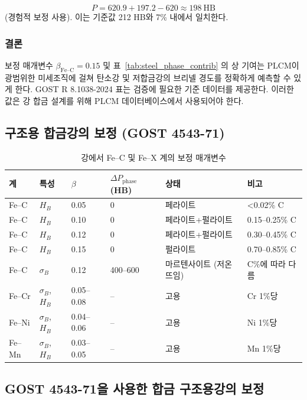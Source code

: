 \documentclass[12pt,a4paper]{article}
\begin{document}
	\[
	P = 620.9 + 197.2 - 620 \approx 198\ \text{HB}
	\]
	(경험적 보정 사용). 이는 기준값 212 HB와 7\% 내에서 일치한다.
	
	\subsubsection{결론}
	
	보정 매개변수 $\beta_{\text{Fe–C}} = 0.15$ 및 표~\ref{tab:steel_phase_contrib} 의 상 기여는 PLCM이 광범위한 미세조직에 걸쳐 탄소강 및 저합금강의 브리넬 경도를 정확하게 예측할 수 있게 한다. GOST R 8.1038-2024 표는 검증에 필요한 기준 데이터를 제공한다. 이러한 값은 강 합금 설계를 위해 PLCM 데이터베이스에서 사용되어야 한다.
	
	\subsection{구조용 합금강의 보정 (GOST 4543-71)}
	\begin{longtable}{p{2.5cm} p{1.2cm} p{1.2cm} p{1.5cm} p{2.0cm} p{2.0cm}}
		\caption{강에서 Fe–C 및 Fe–X 계의 보정 매개변수}\\
		\toprule
		\textbf{계} & \textbf{특성} & $\beta$ & $\Delta P_{\text{phase}}$ (HB) & \textbf{상태} & \textbf{비고} \\
		\midrule
		Fe–C & $H_B$ & 0.05 & 0 & 페라이트 & <0.02\% C \\
		Fe–C & $H_B$ & 0.10 & 0 & 페라이트+펄라이트 & 0.15–0.25\% C \\
		Fe–C & $H_B$ & 0.12 & 0 & 페라이트+펄라이트 & 0.30–0.45\% C \\
		Fe–C & $H_B$ & 0.15 & 0 & 펄라이트 & 0.70–0.85\% C \\
		Fe–C & $\sigma_B$ & 0.12 & 400–600 & 마르텐사이트 (저온 뜨임) & C\%에 따라 다름 \\
		Fe–Cr & $\sigma_B$, $H_B$ & 0.05–0.08 & – & 고용 & Cr 1\%당 \\
		Fe–Ni & $\sigma_B$, $H_B$ & 0.04–0.06 & – & 고용 & Ni 1\%당 \\
		Fe–Mn & $\sigma_B$, $H_B$ & 0.03–0.05 & – & 고용 & Mn 1\%당 \\
		\bottomrule
	\end{longtable}
	
	
	\subsection{GOST 4543-71을 사용한 합금 구조용강의 보정}
	\label{subsec:steel_calibration_gost4543}
	
\end{document}
